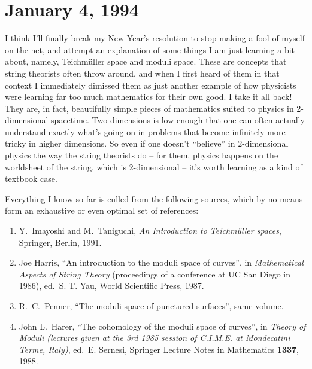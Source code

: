 \documentclass[12pt]{article}
\begin{document}
\hypertarget{week28}{%
\section{January 4, 1994}\label{week28}}

I think I'll finally break my New Year's resolution to stop making a
fool of myself on the net, and attempt an explanation of some things I
am just learning a bit about, namely, Teichm\"uller space and moduli
space. These are concepts that string theorists often throw around, and
when I first heard of them in that context I immediately dimissed them
as just another example of how physicists were learning far too much
mathematics for their own good. I take it all back! They are, in fact,
beautifully simple pieces of mathematics suited to physics in
2-dimensional spacetime. Two dimensions is low enough that one can often
actually understand exactly what's going on in problems that become
infinitely more tricky in higher dimensions. So even if one doesn't
``believe'' in \(2\)-dimensional physics the way the string theorists do
-- for them, physics happens on the worldsheet of the string, which is
2-dimensional -- it's worth learning as a kind of textbook case.

Everything I know so far is culled from the following sources, which by
no means form an exhaustive or even optimal set of references:

\begin{enumerate}
\def\labelenumi{\arabic{enumi})}
\item
  Y.\ Imayoshi and M.\  Taniguchi, \emph{An Introduction to Teichm\"uller spaces}, Springer, Berlin, 1991.
\item
  Joe Harris, ``An introduction to the moduli space of curves'', in
  \emph{Mathematical Aspects of String Theory} (proceedings of a
  conference at UC San Diego in 1986), ed.~S. T. Yau, World Scientific
  Press, 1987.
\item 
R.\ C.\ Penner, ``The moduli space of punctured surfaces'', same
volume.
\item
   John L.\ Harer, ``The cohomology of the moduli space of curves'', in
  \emph{Theory of Moduli (lectures given at the 3rd 1985 session of
  C.I.M.E. at Mondecatini Terme, Italy)}, ed.~E. Sernesi,
  Springer Lecture Notes in Mathematics \textbf{1337}, 1988.
\end{enumerate}
\end{document}
